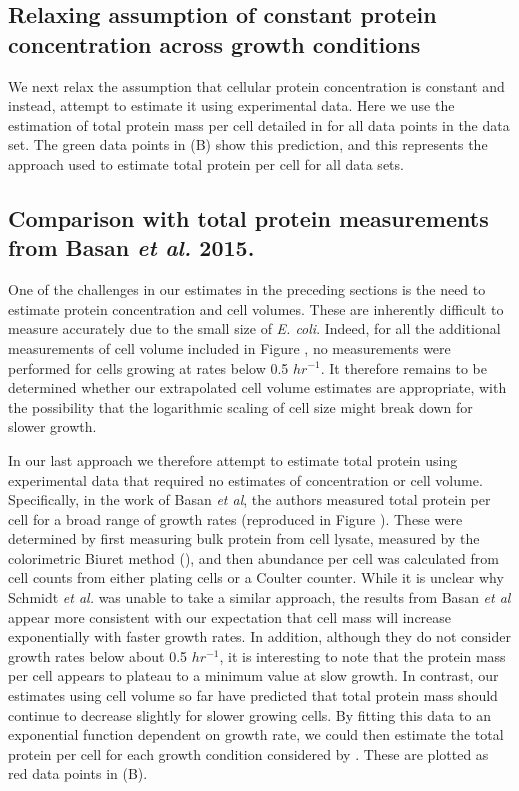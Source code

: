 \subsection{Relaxing assumption of constant protein concentration across growth conditions}
We next relax the assumption that cellular protein concentration is constant and
instead, attempt to  estimate it using experimental data. Here we use the
estimation of total protein mass per cell detailed in
 for all data points in the
\cite{schmidt2016} data set. The green data points in
(B) show this prediction, and this represents
the approach used to estimate total protein per cell for all data sets.


\subsection{Comparison with total protein measurements from Basan \textit{et al.} 2015.}
One of the challenges in our estimates in the preceding  sections is the need to
estimate protein concentration and cell volumes. These are inherently difficult
to measure accurately due to the small size of \textit{E. coli}. Indeed, for all the
additional measurements of cell volume included in Figure
, no measurements were performed for cells growing
at rates below 0.5 $hr^{-1}$. It therefore remains to be determined whether our
extrapolated cell volume estimates are appropriate, with the possibility that
the logarithmic scaling of cell size might break down for slower growth.

In our last approach we therefore attempt to estimate total protein using
experimental data that required  no estimates of concentration or cell volume.
Specifically, in the work of  Basan \textit{et al}, the authors measured total
protein per cell for a broad range of growth rates (reproduced in Figure
). These were determined by first measuring
bulk protein from cell lysate, measured by the colorimetric Biuret method
(\cite{You2013}), and then abundance per cell was calculated from cell counts
from either plating cells or a Coulter counter. While it is unclear why Schmidt
\textit{et al.} was unable to take a similar approach, the results from Basan
\textit{et al} appear more consistent with our expectation that cell mass will
increase exponentially with faster growth rates. In addition, although they do
not consider growth rates below about 0.5 $hr^{-1}$, it is interesting to note
that the protein mass per cell appears to plateau to a minimum value at slow
growth. In contrast, our estimates using cell volume so far have predicted that
total protein mass should continue to decrease slightly for slower growing
cells. By fitting this data to an exponential function dependent on growth rate,
we could then estimate the total protein per cell for each growth condition
considered by \cite{schmidt2016}. These are plotted as red data points in
(B).


